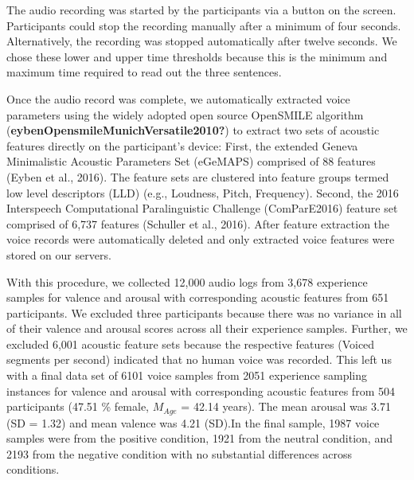 \documentclass[
  english,
  man,floatsintext]{apa6}
\begin{document}
The audio recording was started by the participants via a button on the screen. Participants could stop the recording manually after a minimum of four seconds. Alternatively, the recording was stopped automatically after twelve seconds. We chose these lower and upper time thresholds because this is the minimum and maximum time required to read out the three sentences.

Once the audio record was complete, we automatically extracted voice parameters using the widely adopted open source OpenSMILE algorithm (\textbf{eybenOpensmileMunichVersatile2010?}) to extract two sets of acoustic features directly on the participant's device: First, the extended Geneva Minimalistic Acoustic Parameters Set (eGeMAPS) comprised of 88 features (Eyben et al., 2016). The feature sets are clustered into feature groups termed low level descriptors (LLD) (e.g., Loudness, Pitch, Frequency). Second, the 2016 Interspeech Computational Paralinguistic Challenge (ComParE2016) feature set comprised of 6,737 features (Schuller et al., 2016). After feature extraction the voice records were automatically deleted and only extracted voice features were stored on our servers.

With this procedure, we collected 12,000 audio logs from 3,678 experience samples for valence and arousal with corresponding acoustic features from 651 participants. We excluded three participants because there was no variance in all of their valence and arousal scores across all their experience samples. Further, we excluded 6,001 acoustic feature sets because the respective features (Voiced segments per second) indicated that no human voice was recorded. This left us with a final data set of 6101 voice samples from 2051 experience sampling instances for valence and arousal with corresponding acoustic features from 504 participants (47.51
\% female, \(M_{Age}\) = 42.14 years). The mean arousal was 3.71 (SD = 1.32) and mean valence was 4.21 (SD).In the final sample, 1987 voice samples were from the positive condition, 1921 from the neutral condition, and 2193 from the negative condition with no substantial differences across conditions.
\end{document}
